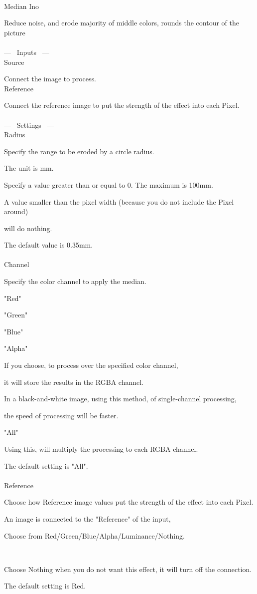 \documentclass[a4paper,12pt]{article}
\begin{document}
\thispagestyle{empty}

\Large
\noindent \\
Median Ino\medskip
\par
\normalsize
Reduce noise, and erode majority of middle colors, rounds the contour of the picture\\
\\
--- \ Inputs \ ---\\
Source\par
Connect the image to process.\\
Reference\par
Connect the reference image to put the strength of the effect into each Pixel.\\
\\
--- \ Settings \ ---\\
Radius\par
Specify the range to be eroded by a circle radius.\par
The unit is mm.\\
\par
Specify a value greater than or equal to 0. The maximum is 100mm.\par
A value smaller than the pixel width (because you do not include the Pixel around)\par
will do nothing.\\
\par
The default value is 0.35mm.\\
\\
Channel\par
Specify the color channel to apply the median.\\
\par
"Red"\par
"Green"\par
"Blue"\par
"Alpha"\par
If you choose, to process over the specified color channel,\par
it will store the results in the RGBA channel.\par
In a black-and-white image, using this method, of single-channel processing,\par
the speed of processing will be faster.\\
\par
"All"\par
Using this, will multiply the processing to each RGBA channel.\\
\par
The default setting is "All".\\
\\
Reference\par
Choose how Reference image values put the strength of the effect into each Pixel.\par
An image is connected to the "Reference" of the input,\par
Choose from Red/Green/Blue/Alpha/Luminance/Nothing.

\newpage

\thispagestyle{empty}

\ \vspace{-0.2em}
\par
Choose Nothing when you do not want this effect, it will turn off the connection.\par
The default setting is Red.
\end{document}
